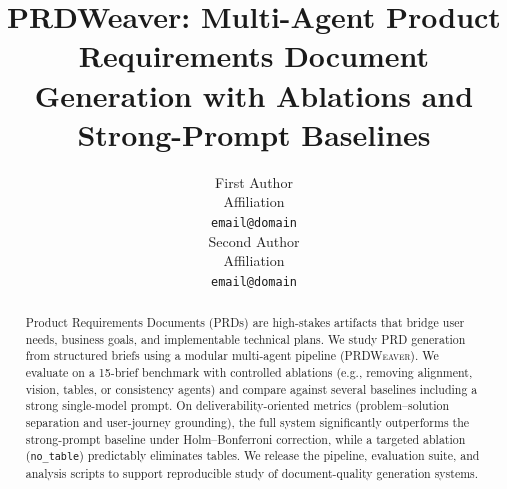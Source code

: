 \documentclass[11pt]{article}
\title{PRDWeaver: Multi-Agent Product Requirements Document Generation with Ablations and Strong-Prompt Baselines}
\author{
  First Author \\
  Affiliation \\
  \texttt{email@domain} \\\And
  Second Author \\
  Affiliation \\
  \texttt{email@domain}
}
\begin{document}
\maketitle

\begin{abstract}
Product Requirements Documents (PRDs) are high-stakes artifacts that bridge user needs, business goals, and implementable technical plans.
We study PRD generation from structured briefs using a modular multi-agent pipeline (\textsc{PRDWeaver}).
We evaluate on a 15-brief benchmark with controlled ablations (e.g., removing alignment, vision, tables, or consistency agents) and compare against several baselines including a strong single-model prompt.
On deliverability-oriented metrics (problem--solution separation and user-journey grounding), the full system significantly outperforms the strong-prompt baseline under Holm--Bonferroni correction, while a targeted ablation (\texttt{no\_table}) predictably eliminates tables.
We release the pipeline, evaluation suite, and analysis scripts to support reproducible study of document-quality generation systems.
\end{abstract}














\appendix

\end{document}
